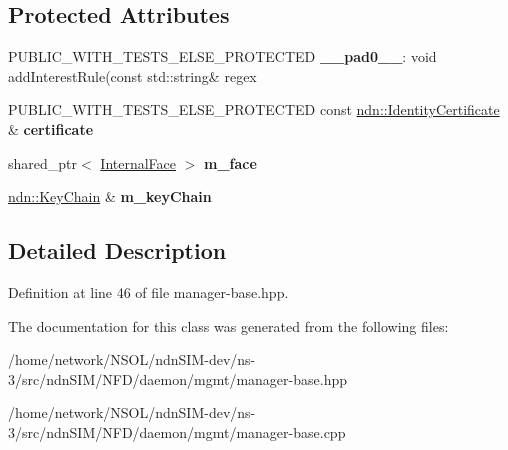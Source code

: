 \subsection*{Protected Attributes}
\begin{DoxyCompactItemize}
\item 
P\+U\+B\+L\+I\+C\+\_\+\+W\+I\+T\+H\+\_\+\+T\+E\+S\+T\+S\+\_\+\+E\+L\+S\+E\+\_\+\+P\+R\+O\+T\+E\+C\+T\+ED {\bfseries \+\_\+\+\_\+pad0\+\_\+\+\_\+}\+: void add\+Interest\+Rule(const std\+::string\& regex\hypertarget{classnfd_1_1ManagerBase_a912fbd04ca89a14aabb943d5c5e8bc7c}{}\label{classnfd_1_1ManagerBase_a912fbd04ca89a14aabb943d5c5e8bc7c}

\item 
P\+U\+B\+L\+I\+C\+\_\+\+W\+I\+T\+H\+\_\+\+T\+E\+S\+T\+S\+\_\+\+E\+L\+S\+E\+\_\+\+P\+R\+O\+T\+E\+C\+T\+ED const \hyperlink{classndn_1_1IdentityCertificate}{ndn\+::\+Identity\+Certificate} \& {\bfseries certificate}\hypertarget{classnfd_1_1ManagerBase_a7f639e45b65d47c221d84cc4c89963a2}{}\label{classnfd_1_1ManagerBase_a7f639e45b65d47c221d84cc4c89963a2}

\item 
shared\+\_\+ptr$<$ \hyperlink{classnfd_1_1InternalFace}{Internal\+Face} $>$ {\bfseries m\+\_\+face}\hypertarget{classnfd_1_1ManagerBase_ac18ebd03eae4a10358930e8773236fb7}{}\label{classnfd_1_1ManagerBase_ac18ebd03eae4a10358930e8773236fb7}

\item 
\hyperlink{classndn_1_1security_1_1KeyChain}{ndn\+::\+Key\+Chain} \& {\bfseries m\+\_\+key\+Chain}\hypertarget{classnfd_1_1ManagerBase_a7ab7623dd7ae9dea078ddf746ba6438c}{}\label{classnfd_1_1ManagerBase_a7ab7623dd7ae9dea078ddf746ba6438c}

\end{DoxyCompactItemize}


\subsection{Detailed Description}


Definition at line 46 of file manager-\/base.\+hpp.



The documentation for this class was generated from the following files\+:\begin{DoxyCompactItemize}
\item 
/home/network/\+N\+S\+O\+L/ndn\+S\+I\+M-\/dev/ns-\/3/src/ndn\+S\+I\+M/\+N\+F\+D/daemon/mgmt/manager-\/base.\+hpp\item 
/home/network/\+N\+S\+O\+L/ndn\+S\+I\+M-\/dev/ns-\/3/src/ndn\+S\+I\+M/\+N\+F\+D/daemon/mgmt/manager-\/base.\+cpp\end{DoxyCompactItemize}
